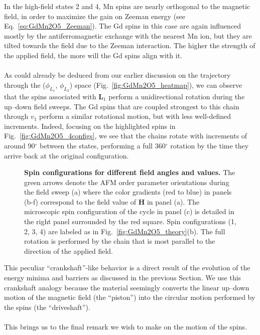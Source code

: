 In the high-field states 2 and 4, Mn spins are nearly orthogonal to the magnetic field, in order to maximize the gain on Zeeman energy (see Eq.~\eqref{eq:GdMn2O5_Zeeman}).
The Gd spins in this case are again influenced mostly by the antiferromagnetic exchange with the nearest Mn ion, but they are tilted towards the field due to the Zeeman interaction.
The higher the strength of the applied field, the more will the Gd spins align with it.
\\\\
As could already be deduced from our earlier discussion on the trajectory through the ($\phi_{L_1}$, $\phi_{L_2}$) space (Fig.~\ref{fig:GdMn2O5_heatmap}), we can observe that the spins associated with $\bm L_1$ perform a unidirectional rotation during the up--down field sweeps.
The Gd spins that are coupled strongest to this chain through $v_1$ perform a similar rotational motion, but with less well-defined increments.
Indeed, focusing on the highlighted spins in Fig.~\ref{fig:GdMn2O5_4configs}, we see that the chains rotate with increments of around 90$^\circ$ between the states, performing a full 360$^\circ$ rotation by the time they arrive back at the original configuration.
\begin{figure}
	\caption{{\bf Spin configurations for different field angles and values.} The green arrows denote the AFM order parameter orientations during the field sweep (a) where the color gradients (red to blue) in panels (b-f) correspond to the field value of $\bm{H}$ in panel (a). The microscopic spin configuration of the cycle in panel (c) is detailed in the right panel surrounded by the red square. Spin configurations (1, 2, 3, 4) are labeled as in Fig.~\ref{fig:GdMn2O5_theory}(b). The full rotation is performed by the chain that is most parallel to the direction of the applied field. \label{fig:GdMn2O5_regimes}}  
\end{figure}
This peculiar ``crankshaft''-like behavior is a direct result of the evolution of the energy minima and barriers as discussed in the previous Section.
We use this crankshaft analogy because the material seemingly converts the linear up--down motion of the magnetic field (the ``piston'') into the circular motion performed by the spins (the ``driveshaft'').
\\\\
This brings us to the final remark we wish to make on the motion of the spins.
